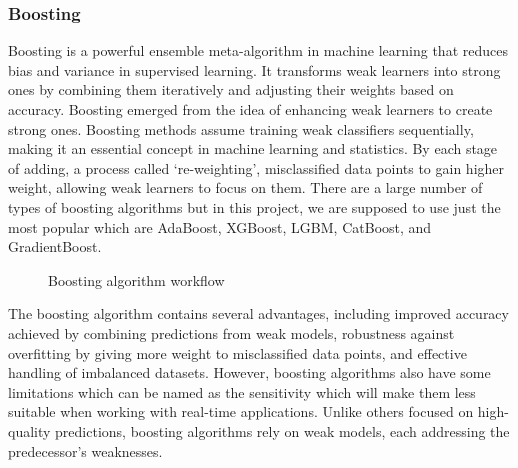 \subsubsection{Boosting}
Boosting is a powerful ensemble meta-algorithm in machine learning that reduces bias and variance in supervised learning. It transforms weak learners into strong ones by combining them iteratively and adjusting their weights based on accuracy. Boosting emerged from the idea of enhancing weak learners to create strong ones. Boosting methods assume training weak classifiers sequentially, making it an essential concept in machine learning and statistics. By each stage of adding, a process called ‘re-weighting’, misclassified data points to gain higher weight, allowing weak learners to focus on them. There are a large number of types of boosting algorithms but in this project, we are supposed to use just the most popular which are AdaBoost, XGBoost, LGBM, CatBoost, and GradientBoost. 


\begin{figure}[h]
\centering
\caption{Boosting algorithm workflow} \label{fig:result-checkpoint-micro}
\end{figure}


The boosting algorithm contains several advantages, including improved accuracy achieved by combining predictions from weak models, robustness against overfitting by giving more weight to misclassified data points, and effective handling of imbalanced datasets. However, boosting algorithms also have some limitations which can be named as the sensitivity which will make them less suitable when working with real-time applications. Unlike others focused on high-quality predictions, boosting algorithms rely on weak models, each addressing the predecessor’s weaknesses. 


